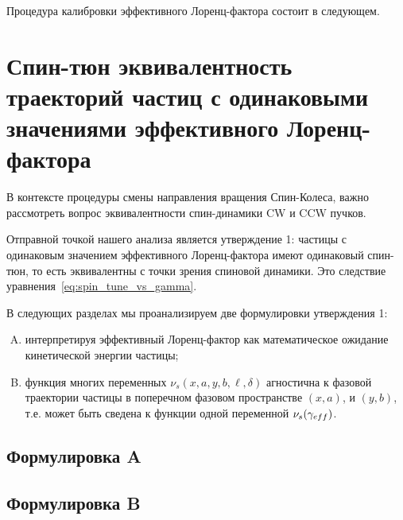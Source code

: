 Процедура калибровки эффективного Лоренц-фактора состоит в следующем.

%

\section{Спин-тюн эквивалентность траекторий частиц с одинаковыми значениями эффективного Лоренц-фактора}\label{sec:spin_tune_traj_equivalence}
В контексте процедуры смены направления вращения Спин-Колеса, важно рассмотреть вопрос эквивалентности спин-динамики CW и CCW пучков. 

Отправной точкой нашего анализа является утверждение 1: частицы с одинаковым значением эффективного Лоренц-фактора имеют одинаковый спин-тюн, то есть эквивалентны с точки зрения спиновой динамики. Это следствие уравнения~\eqref{eq:spin_tune_vs_gamma}.

В следующих разделах мы проанализируем две формулировки утверждения 1:
\begin{enumerate}[A.]
	\item интерпретируя эффективный Лоренц-фактор как математическое ожидание кинетической энергии частицы;
	\item функция многих переменных $\nu_s(x, a, y, b, \ell, \delta)$ агностична к фазовой траектории частицы в поперечном фазовом пространстве $(x,a)$, и $(y,b)$, т.е. может быть сведена к функции одной переменной $\nu_s(\g*)$.
\end{enumerate}

\subsection{Формулировка A}
%

\subsection{Формулировка B}\label{sec:spin_stune_traj_equ:B_form}
%

\clearpage
